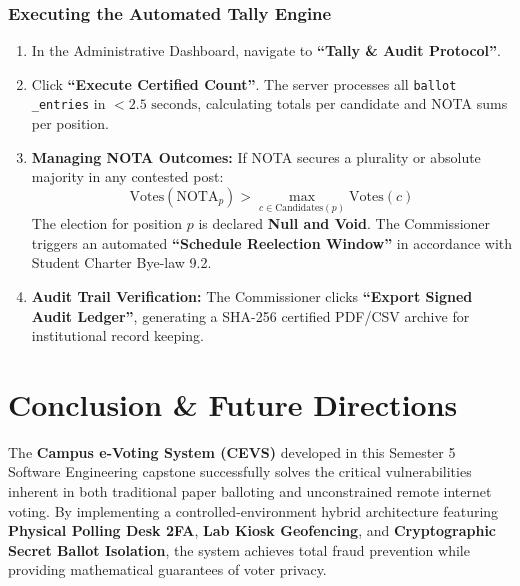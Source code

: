 \documentclass[12pt,a4paper,oneside]{report}
\begin{document}
\subsection{Executing the Automated Tally Engine}
\begin{enumerate}
    \item In the Administrative Dashboard, navigate to \textbf{``Tally \& Audit Protocol''}.
    \item Click \textbf{``Execute Certified Count''}. The server processes all \texttt{ballot\\_entries} in $<2.5\text{ seconds}$, calculating totals per candidate and NOTA sums per position.
    \item \textbf{Managing NOTA Outcomes:} If NOTA secures a plurality or absolute majority in any contested post:
    \begin{equation}
        \text{Votes}(\text{NOTA}_p) > \max_{c \in \text{Candidates}(p)} \text{Votes}(c)
    \end{equation}
    The election for position $p$ is declared \textbf{Null and Void}. The Commissioner triggers an automated \textbf{``Schedule Reelection Window''} in accordance with Student Charter Bye-law 9.2.
    \item \textbf{Audit Trail Verification:} The Commissioner clicks \textbf{``Export Signed Audit Ledger''}, generating a SHA-256 certified PDF/CSV archive for institutional record keeping.
\end{enumerate}

\chapter*{Conclusion \& Future Directions}

The \textbf{Campus e-Voting System (CEVS)} developed in this Semester 5 Software Engineering capstone successfully solves the critical vulnerabilities inherent in both traditional paper balloting and unconstrained remote internet voting. By implementing a controlled-environment hybrid architecture featuring \textbf{Physical Polling Desk 2FA}, \textbf{Lab Kiosk Geofencing}, and \textbf{Cryptographic Secret Ballot Isolation}, the system achieves total fraud prevention while providing mathematical guarantees of voter privacy.
\end{document}
